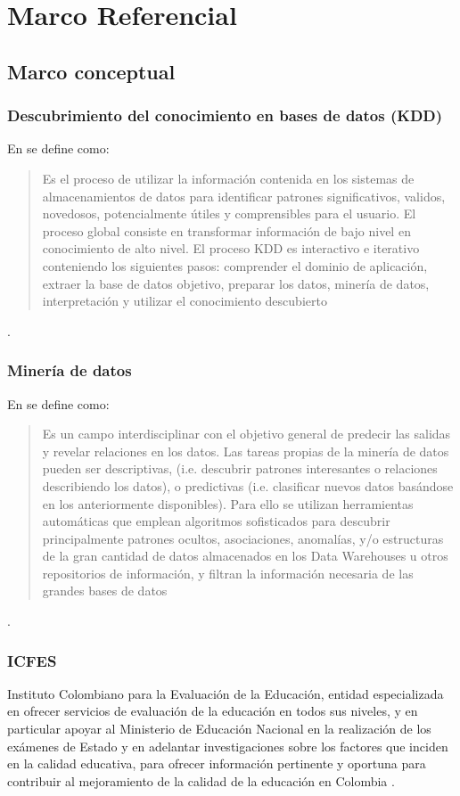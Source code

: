\chapter{Marco Referencial}
\section{Marco conceptual}
\subsection{Descubrimiento del conocimiento en bases de datos (KDD)}
En \cite{key-60} se define como: \begin{quote} Es el proceso de utilizar la información contenida en los sistemas de almacenamientos de datos para identificar patrones significativos, validos, novedosos, potencialmente útiles y comprensibles para el usuario. El proceso global consiste en transformar información de bajo nivel en conocimiento de alto nivel. El proceso KDD es interactivo e iterativo conteniendo los siguientes pasos: comprender el dominio de aplicación, extraer la base de datos objetivo, preparar los datos, minería de datos, interpretación y utilizar el conocimiento descubierto \end{quote}.
\subsection{Minería de datos}
En \cite{key-60} se define como: \begin{quote} Es un campo interdisciplinar con el objetivo general de predecir las salidas y revelar relaciones en los datos. Las tareas propias de la minería de datos pueden ser descriptivas, (i.e. descubrir patrones interesantes o relaciones describiendo los datos), o predictivas (i.e. clasificar nuevos datos basándose en los anteriormente disponibles). Para ello se utilizan herramientas automáticas que emplean algoritmos sofisticados para descubrir principalmente patrones ocultos, asociaciones, anomalías, y/o estructuras de la gran cantidad de datos almacenados en los Data Warehouses u otros repositorios de información, y filtran la información necesaria de las grandes bases de datos \end{quote}.
\subsection{ICFES}
Instituto Colombiano para la Evaluación de la Educación, entidad especializada en ofrecer servicios de evaluación de la educación en todos sus niveles, y en particular apoyar al Ministerio de Educación Nacional en la realización de los exámenes de Estado y en adelantar investigaciones sobre los factores que inciden en la calidad educativa, para ofrecer información pertinente y oportuna para contribuir al mejoramiento de la calidad de la educación en Colombia \cite{key-80}.

